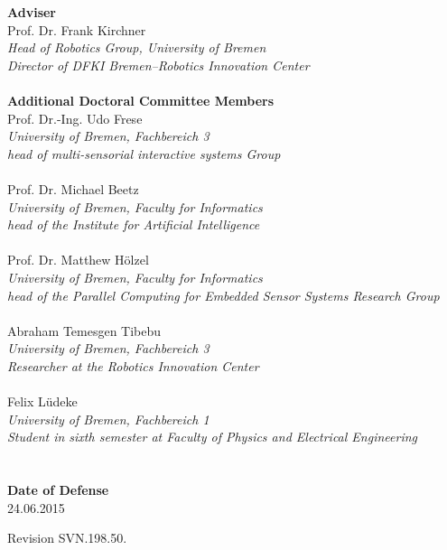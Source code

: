 \vfill
\textbf{Adviser}\\
Prof. Dr. Frank Kirchner\\
{\footnotesize{\itshape Head of Robotics Group, University of Bremen\\
Director of DFKI Bremen--Robotics Innovation Center}}\\
\textbf{}\\
\textbf{Additional Doctoral Committee Members}\\
Prof. Dr.-Ing. Udo Frese\\
{\quad\footnotesize{\itshape University of Bremen, Fachbereich 3\\
head of multi-sensorial interactive systems Group}}\\~\\
Prof. Dr. Michael Beetz\\
{\quad\footnotesize{\itshape University of Bremen, Faculty for Informatics\\
head of the Institute for Artificial Intelligence}}\\~\\
Prof. Dr. Matthew H\"olzel\\
{\quad\footnotesize{\itshape University of Bremen, Faculty for Informatics\\
    head of the Parallel Computing for Embedded Sensor Systems Research Group}}\\~\\
Abraham Temesgen Tibebu\\
{\quad\footnotesize{\itshape University of Bremen, Fachbereich 3\\
Researcher at the Robotics Innovation Center}}\\~\\
Felix L\"udeke\\
{\quad\footnotesize{\itshape University of Bremen, Fachbereich 1\\ 
Student in sixth semester at Faculty of Physics and Electrical Engineering}}\\
~\\
\\
\textbf{Date of Defense}\\
24.06.2015

\vfill
{\tiny Revision SVN.198.50.\mydate }


